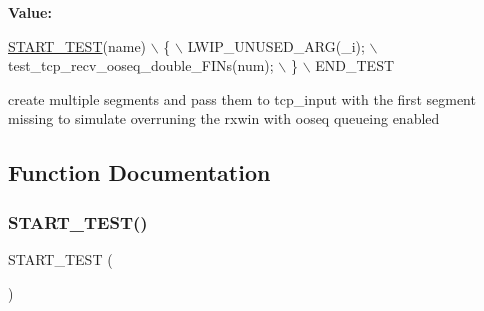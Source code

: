 {\bfseries Value\+:}
\begin{DoxyCode}
\hyperlink{native_2lwip_2test_2unit_2tcp_2test__tcp__oos_8c_a06e57221ae3e212e0ce776587a9fc062}{START\_TEST}(name) \(\backslash\)
  \{ \(\backslash\)
    LWIP\_UNUSED\_ARG(\_i); \(\backslash\)
    test\_tcp\_recv\_ooseq\_double\_FINs(num); \(\backslash\)
  \} \(\backslash\)
  END\_TEST
\end{DoxyCode}
create multiple segments and pass them to tcp\+\_\+input with the first segment missing to simulate overruning the rxwin with ooseq queueing enabled 

\subsection{Function Documentation}
\mbox{\label{openmote-cc2538_2lwip_2test_2unit_2tcp_2test__tcp__oos_8c_a06e57221ae3e212e0ce776587a9fc062}} 
\subsubsection{\texorpdfstring{S\+T\+A\+R\+T\+\_\+\+T\+E\+S\+T()}{START\_TEST()}\hspace{0.1cm}{\footnotesize\ttfamily [1/6]}}
{\footnotesize\ttfamily S\+T\+A\+R\+T\+\_\+\+T\+E\+ST (\begin{DoxyParamCaption}\item[{test\+\_\+tcp\+\_\+recv\+\_\+ooseq\+\_\+\+F\+I\+N\+\_\+\+O\+O\+S\+EQ}]{ }\end{DoxyParamCaption})}

